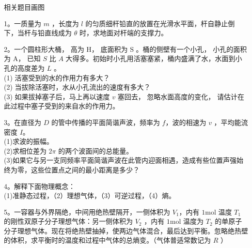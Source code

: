 
\begin{issues}
相关题目画图
\end{issues}

1。一质量为 $m$ ，长度为 $l$ 的匀质细杆铅直的放置在光滑水平面，杆自静止倒下，当杆与铅直线成为 $\theta$ 时，求地面对杆端的支撑力。

2。一个圆柱形大桶， 高为 $\mathrm{H}$， 底面积为 $\mathrm{S}$ 。桶的侧壁有一个小孔， 小孔的面积为 $\mathrm{A}$， 已知 $S$ 比 $A$ 大得多。初始时小孔用活塞塞紧，桶内盛满了水，水面到小孔的高度差为 $L$ 。\\
(1) 活塞受到的水的作用力有多大？ \\
(2) 当拔除活塞时，水从小孔流出的速度有多大？ \\
(3) 如果拔掉塞子后，马上再以速度 $v$ 塞回去， 忽略水面高度的变化， 请估计在此过程中塞子受到的来自水的作用力。

3。在直径为 $D$ 的管中传播的平面简谐声波，频率为 $f$，波的相速为 $v$ ，平均能流密度 $I$。\\
(1)求波的振幅。\\
(2)求相位差为 $2\pi$ 的两个波面间的总能量。\\
(3)如果它与另一支同频率平面简谐声波在此管内迎面相遇，造成有些位置声强始终为零，这些位置点之间的最小距离是多少？

4。解释下面物理概念：\\
(1)准静态过程，（2）理想气体，（3）可逆过程，（4）熵。

5。一容器与外界隔绝，中间用绝热壁隔开，一侧体积为 $V_1$，内有 $1\mathrm{mol}$ 温度 $T_1$ 的刚性双原子分子理想气体：另一侧体积为 $V_2$ ，内有 $1\mathrm{mol}$ 温度为 $T_2$ 的单原子分子理想气体。现在将绝热壁抽掉，使两边气体混合，最后达到平衡。忽略绝热壁的体积，求平衡时的温度和过程中气体的总熵变。（气体普适常数记为 $R$ ）

